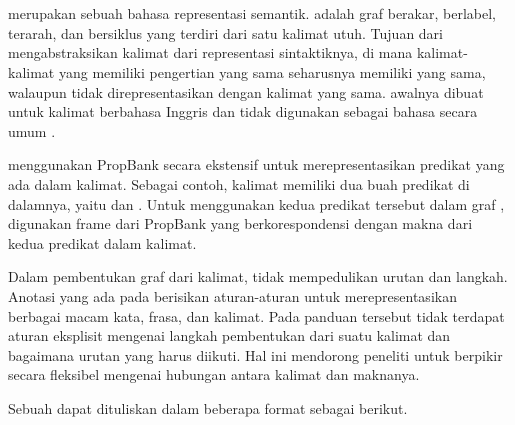 \section{}

 merupakan sebuah bahasa representasi semantik.
\AMR{} adalah graf berakar, berlabel, terarah, dan bersiklus yang terdiri dari satu kalimat utuh.
Tujuan dari \AMR{} mengabstraksikan kalimat dari representasi sintaktiknya, di mana kalimat-kalimat yang memiliki pengertian yang sama seharusnya memiliki \AMR{} yang sama, walaupun tidak direpresentasikan dengan kalimat yang sama.
\AMR{} awalnya dibuat untuk kalimat berbahasa Inggris dan tidak digunakan sebagai bahasa secara umum .

\AMR{} menggunakan  PropBank  secara ekstensif untuk merepresentasikan predikat yang ada dalam kalimat.
Sebagai contoh, kalimat  memiliki dua buah predikat di dalamnya, yaitu  dan .
Untuk menggunakan kedua predikat tersebut dalam graf \AMR{}, digunakan frame dari PropBank yang berkorespondensi dengan makna dari kedua predikat dalam kalimat.

Dalam pembentukan graf dari kalimat, \AMR{} tidak mempedulikan urutan dan langkah.
Anotasi yang ada pada \AMR{} berisikan aturan-aturan untuk merepresentasikan berbagai macam kata, frasa, dan kalimat.
Pada panduan tersebut tidak terdapat aturan eksplisit mengenai langkah pembentukan \AMR{} dari suatu kalimat dan bagaimana urutan yang harus diikuti.
Hal ini mendorong peneliti untuk berpikir secara fleksibel mengenai hubungan antara kalimat dan maknanya.

Sebuah \AMR{} dapat dituliskan dalam beberapa format sebagai berikut.

